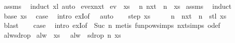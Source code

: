 \begin{isabellebody}
%
\isadelimproof
%
\endisadelimproof
%
\isatagproof
{}\isamarkupfalse%
\ assms\ \isamarkupfalse%
\ {\isacharparenleft}induct\ xl{\isacharparenright}\ auto%
\endisatagproof
{\isafoldproof}%
%
\isadelimproof
\isanewline
%
\endisadelimproof
\isanewline
{}\isamarkupfalse%
\ ev{\isacharunderscore}ex{\isacharunderscore}nxt{\isacharcolon}\isanewline
{}\ {\isachardoublequoteopen}ev\ {\isasymphi}\ xs{\isachardoublequoteclose}\isanewline
{}\ {\isachardoublequoteopen}{\isasymexists}\ n{\isachardot}\ {\isacharparenleft}nxt\ {\isacharcircum}{\isacharcircum}\ n{\isacharparenright}\ {\isasymphi}\ xs{\isachardoublequoteclose}\isanewline
%
\isadelimproof
%
\endisadelimproof
%
\isatagproof
{}\isamarkupfalse%
\ assms\ \isamarkupfalse%
\ induct\isanewline
\ \ \isamarkupfalse%
\ {\isacharparenleft}base\ xs{\isacharparenright}\ \isamarkupfalse%
\ {\isacharquery}case\ \isamarkupfalse%
\ {\isacharparenleft}intro\ exI{\isacharbrackleft}of\ {\isacharunderscore}\ {}{\isacharbrackright}{\isacharparenright}\ auto\isanewline
{}\isamarkupfalse%
\isanewline
\ \ \isamarkupfalse%
\ {\isacharparenleft}step\ xs{\isacharparenright}\isanewline
\ \ \isamarkupfalse%
\ \isamarkupfalse%
\ n\ \ {\isachardoublequoteopen}{\isacharparenleft}nxt\ {\isacharcircum}{\isacharcircum}\ n{\isacharparenright}\ {\isasymphi}\ {\isacharparenleft}stl\ xs{\isacharparenright}{\isachardoublequoteclose}\ \isamarkupfalse%
\ blast\isanewline
\ \ \isamarkupfalse%
\ {\isacharquery}case\ \isamarkupfalse%
\ {\isacharparenleft}intro\ exI{\isacharbrackleft}of\ {\isacharunderscore}\ {\isachardoublequoteopen}Suc\ n{\isachardoublequoteclose}{\isacharbrackright}{\isacharparenright}\ {\isacharparenleft}metis\ funpow{\isachardot}simps{\isacharparenleft}{}{\isacharparenright}\ nxt{\isachardot}simps\ o{\isacharunderscore}def{\isacharparenright}\isanewline
{}\isamarkupfalse%
%
\endisatagproof
{\isafoldproof}%
%
\isadelimproof
\isanewline
%
\endisadelimproof
\isanewline
{}\isamarkupfalse%
\ alw{\isacharunderscore}sdrop{\isacharcolon}\isanewline
{}\ {\isachardoublequoteopen}alw\ {\isasymphi}\ xs{\isachardoublequoteclose}\ \ \ {\isachardoublequoteopen}alw\ {\isasymphi}\ {\isacharparenleft}sdrop\ n\ xs{\isacharparenright}{\isachardoublequoteclose}\isanewline

\end{isabellebody}

